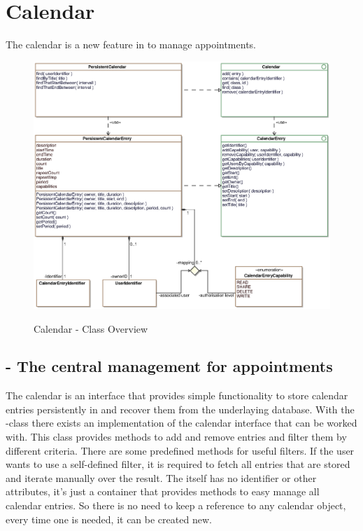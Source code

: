 \newpage
\section{Calendar}

The calendar is a new feature in \salespoint to manage appointments. 

\begin{figure}[ht]
	\centering
  \includegraphics[width=1.0\textwidth]{images/Calendar_Overview.eps}
	\label{calendar_overview}
	\caption{Calendar - Class Overview}
\end{figure}

\subsection{ - The central management for appointments}
The calendar is an interface that provides simple functionality to store calendar entries persistently in and recover them from the underlaying database.
With the -class there exists an implementation of the calendar interface that can be worked with. This class provides methods
to add and remove entries and filter them by different criteria.
There are some predefined methods for useful filters. If the user wants to use a self-defined filter, it is required to fetch all entries that are stored and
iterate manually over the result.  
The  itself has no identifier or other attributes, it's just a container that provides methods to easy manage all calendar entries.
So there is no need to keep a reference to any calendar object, every time one is needed, it can be created new.


